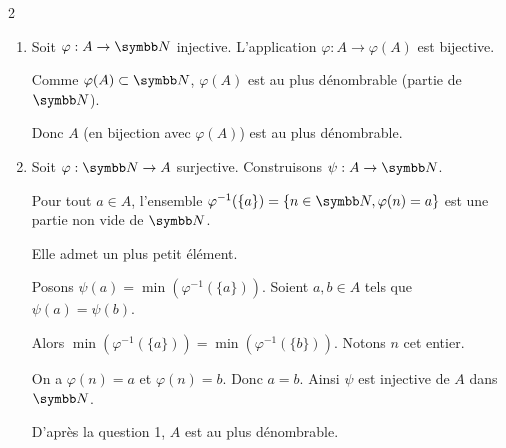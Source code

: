 \begin{correction}{2}
\begin{enumerate}
    \item Soit $\varphi : A \to \N$ injective.
        L'application $\varphi : A \to \varphi(A)$ est bijective.

        Comme $\varphi(A) \subset \N$, $\varphi(A)$ est au plus dénombrable (partie de $\N$).
        
        Donc $A$ (en bijection avec $\varphi(A)$) est au plus dénombrable.

    \item Soit $\varphi : \N \to A$ surjective.
        Construisons $\psi : A \to \N$.

        Pour tout $a \in A$, l'ensemble $\varphi^{-1}(\{a\}) = \{n \in \N, \varphi(n)=a\}$ est une partie non vide de $\N$.

        Elle admet un plus petit élément. 

        Posons $\psi(a) = \min(\varphi^{-1}(\{a\}))$.
        Soient $a, b \in A$ tels que $\psi(a) = \psi(b)$.

        Alors $\min(\varphi^{-1}(\{a\})) = \min(\varphi^{-1}(\{b\}))$. Notons $n$ cet entier.

        On a $\varphi(n) = a$ et $\varphi(n) = b$. Donc $a=b$.
        Ainsi $\psi$ est injective de $A$ dans $\N$.

        D'après la question 1, $A$ est au plus dénombrable.
\end{enumerate}
\end{correction}


